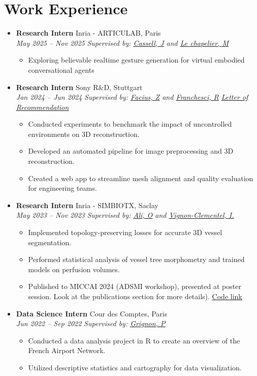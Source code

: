 \documentclass[letterpaper,11pt,twocolumn]{article}
\newcommand{\resumeItem}[1]{\item \small{#1}}
\newcommand{\resumeSubheading}[4]{
	\vspace{-2pt}\item \textbf{#1} \hfill #2 \\
	\textit{\small #3} \hfill \textit{\small #4} 
	\vspace{-7pt}
}
\newcommand{\resumeItemListStart}{\begin{itemize}[leftmargin=*]}
\newcommand{\resumeItemListEnd}{\end{itemize}\vspace{-5pt}}
\begin{document}
	\section{Work Experience}
	\begin{itemize}[leftmargin=*]
		\resumeSubheading
		{Research Intern}{Inria - ARTICULAB, Paris}{May 2025 -- Nov 2025}{\textit{Supervised by: \href{https://scholar.google.com/citations?user=wkC9xHMAAAAJ&hl=en}{\underline{Cassell, J}} and \href{https://fr.linkedin.com/in/marius-le-chapelier-7694b5172}{\underline{Le chapelier, M}}}} 
	
	\resumeItemListStart
	\resumeItem{Exploring believable realtime gesture generation for virtual embodied conversational agents}
	\resumeItemListEnd
	
	\resumeSubheading
	{Research Intern}{Sony R\&D, Stuttgart}{Jan 2024 -- Jun 2024}{\textit{Supervised by: \href{https://de.linkedin.com/in/zoltan-facius-6b424112}{\underline{Facius, Z}} and \href{https://de.linkedin.com/in/roberto-franceschi}{\underline{Franchesci, R}}} \vspace{5pt} \href{https://machtayassine.github.io/resume/Sony_LoR.pdf}{\underline{\textit{Letter of Recommendation}}}}
	
	\resumeItemListStart
	\resumeItem{Conducted experiments to benchmark the impact of uncontrolled environments on 3D reconstruction.}
	\resumeItem{Developed an automated pipeline for image preprocessing and 3D reconstruction.}
	\resumeItem{Created a web app to streamline mesh alignment and quality evaluation for engineering teams.}
	\resumeItemListEnd
	
	\resumeSubheading
	{Research Intern}{Inria - SIMBIOTX, Saclay}{May 2023 -- Nov 2023}{\textit{Supervised by: \href{https://scholar.google.com/citations?user=tKRo0ewAAAAJ&hl=en}{\underline{Ali, O}} and \href{https://team.inria.fr/simbiotx/team-members/irene-vignon-clementel/}{\underline{Vignon-Clementel, I.}}}}
	
	\resumeItemListStart
	\resumeItem{Implemented topology-preserving losses for accurate 3D vessel segmentation.}
	\resumeItem{Performed statistical analysis of vessel tree morphometry and trained models on perfusion volumes.}
	\resumeItem{Published to MICCAI 2024 (ADSMI workshop), presented at poster session. Look at the publications section for more details).} \underline{\href{https://gitlab.inria.fr/simbiotx/LiverVesselSeg}{Code link}}
	\resumeItemListEnd
	
	\resumeSubheading
	{Data Science Intern}{Cour des Comptes, Paris}{Jun 2022 -- Sep 2022}{\textit{Supervised by: \href{https://fr.linkedin.com/in/paulgrignon}{\underline{Grignon, P}}}}
	
	\resumeItemListStart
	\resumeItem{Conducted a data analysis project in R to create an overview of the French Airport Network.}
	\resumeItem{Utilized descriptive statistics and cartography for data visualization.}
	\resumeItemListEnd
\end{itemize}
\end{document}
